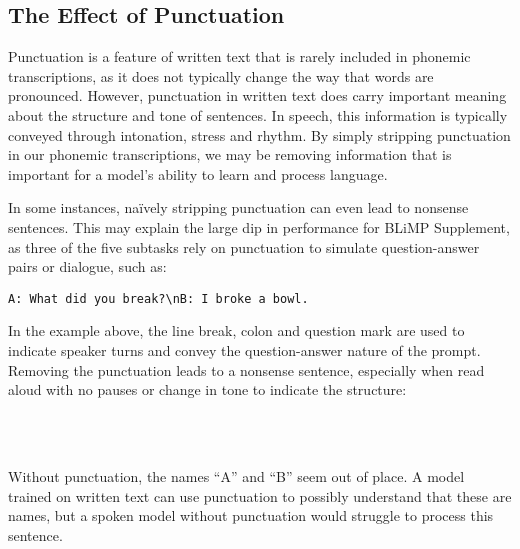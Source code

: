 \subsection{The Effect of Punctuation}
\label{sec:14-punctuation}

Punctuation is a feature of written text that is rarely included in phonemic transcriptions, as it does not typically change the way that words are pronounced. However, punctuation in written text does carry important meaning about the structure and tone of sentences. In speech, this information is typically conveyed through intonation, stress and rhythm. By simply stripping punctuation in our phonemic transcriptions, we may be removing information that is important for a model's ability to learn and process language. 

In some instances, na\"ively stripping punctuation can even lead to nonsense sentences. This may explain the large dip in performance for BLiMP Supplement, as three of the five subtasks rely on punctuation to simulate question-answer pairs or dialogue, such as:

\vspace{-1mm}
\begin{center}
\begin{verbatim}
A: What did you break?\nB: I broke a bowl.
\end{verbatim}
\end{center}
\vspace{-1mm}

In the example above, the line break, colon and question mark are used to indicate speaker turns and convey the question-answer nature of the prompt. Removing the punctuation leads to a nonsense sentence, especially when read aloud with no pauses or change in tone to indicate the structure:

\vspace{-1mm}
\begin{center}
~\textvisiblespace~~\textvisiblespace~~\textvisiblespace~~\textvisiblespace~~~~\textvisiblespace~~\textvisiblespace~~\textvisiblespace\\~\textvisiblespace~~\textvisiblespace~~\textvisiblespace
\end{center}
\vspace{-1mm}

Without punctuation, the names ``A'' and ``B'' seem out of place. A model trained on written text can use punctuation to possibly understand that these are names, but a spoken model without punctuation would struggle to process this sentence.


